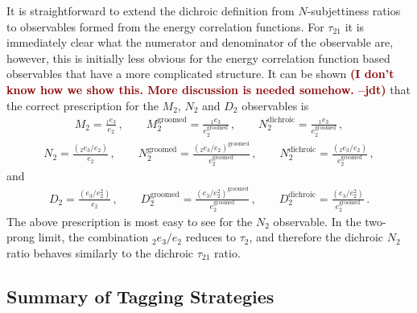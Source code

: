 \documentclass[11pt,letterpaper]{article}
\newcommand{\groomed}{\text{groomed}}
\newcommand{\ecfnobeta}[1]{e_{#1}}
\newcommand{\ecfvarnobeta}[2]{{_{#1}e_{#2}}}
\newcommand{\jdt}[1]{\textbf{\textcolor{darkred}{(#1 --jdt)}}}
\begin{document}
It is straightforward to extend the dichroic definition from $N$-subjettiness ratios to observables formed from the energy correlation functions.
%
For $\tau_{21}$ it is immediately clear what the numerator and denominator of the observable are, however, this is initially less obvious for the energy correlation function based observables that have a more complicated structure.
%
It can be shown \jdt{I don't know how we show this.  More discussion is needed somehow.} that the correct prescription for the $M_2$, $N_2$ and $D_2$ observables is
\begin{align}
M_2= \frac{ \ecfvarnobeta{1}{3}  }{\ecfnobeta{2}}\,, \qquad  M_2^{\text{groomed}}= \frac{ \ecfvarnobeta{1}{3}  }{\ecfnobeta{2}^\groomed}\,, \qquad  N_2^{\text{dichroic}}= \frac{\ecfvarnobeta{1}{3}  }{\ecfnobeta{2}^\groomed}\,, 
\end{align}
\begin{align}
N_2= \frac{\left( \ecfvarnobeta{2}{3} / \ecfnobeta{2} \right) }{\ecfnobeta{2}}\,, \qquad  N_2^{\text{groomed}}= \frac{\left( \ecfvarnobeta{2}{3} / \ecfnobeta{2} \right)^\groomed }{\ecfnobeta{2}^\groomed}\,, \qquad  N_2^{\text{dichroic}}= \frac{\left( \ecfvarnobeta{2}{3} / \ecfnobeta{2} \right) }{\ecfnobeta{2}^\groomed}\,, 
\end{align}
and
\begin{align}
D_2=\frac{\left( \ecfnobeta{3} / \ecfnobeta{2}^2 \right)}{ \ecfnobeta{2}}\,, \qquad D_2^{\text{groomed}}=\frac{\left( \ecfnobeta{3} / \ecfnobeta{2}^2 \right)^\groomed}{ \ecfnobeta{2}^\groomed}\,, \qquad D_2^{\text{dichroic}}=\frac{\left( \ecfnobeta{3} / \ecfnobeta{2}^2 \right)}{ \ecfnobeta{2}^\groomed}\,.
\end{align}
The above prescription is most easy to see for the $N_2$ observable. In the two-prong limit, the combination $ \ecfvarnobeta{2}{3} / \ecfnobeta{2} $ reduces to $\tau_2$, and therefore the dichroic $N_2$ ratio behaves similarly to the dichroic $\tau_{21}$ ratio.

\subsection{Summary of Tagging Strategies}\label{sec:dichroic_sum}
\end{document}
